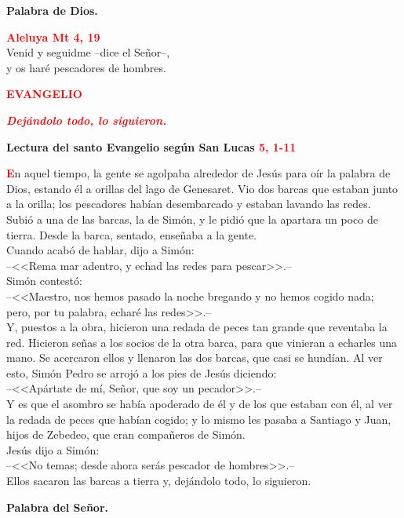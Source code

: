 \documentclass[12pt, letterpaper]{article}
\begin{document}
    {\bfseries Palabra de Dios.}

    \begin{center}
    \Large {\bfseries \textcolor{red}{Aleluya \hspace{1cm} Mt 4, 19}}\\
    Venid y seguidme --dice el Se\~nor--,\\
    y os har\'e pescadores de hombres.
    \end{center}

    \begin{center}
    \Large {\bfseries \textcolor{red}{EVANGELIO}}
    \end{center}

    \begin{center}
    \large {\bfseries \textit{ \textcolor{red}{Dej\'andolo todo, lo siguieron.}}}
    \end{center}

    \Huge \textcolor{red}{} \Large {\bfseries Lectura del santo Evangelio seg\'un San Lucas \hspace{1cm} \textcolor{red}{5, 1-11}}

    \lettrine[lines=2]{\bfseries \textcolor{red}{E}}{}\Large n aquel tiempo, la gente se agolpaba alrededor de Jes\'us para o\'ir la palabra de Dios, estando \'el a orillas del lago de Genesaret. Vio dos barcas que estaban junto a la orilla; los pescadores hab\'ian desembarcado y estaban lavando las redes.\\
    Subi\'o a una de las barcas, la de Sim\'on, y le pidi\'o que la apartara un poco de tierra. Desde la barca, sentado, ense\~naba a la gente.\\
    Cuando acab\'o de hablar, dijo a Sim\'on:\\
    --<<Rema mar adentro, y echad las redes para pescar>>.--\\
    Sim\'on contest\'o:\\
    --<<Maestro, nos hemos pasado la noche bregando y no hemos cogido nada; pero, por tu palabra, echar\'e las redes>>.--\\
    Y, puestos a la obra, hicieron una redada de peces tan grande que reventaba la red. Hicieron se\~nas a los socios de la otra barca, para que vinieran a echarles una mano. Se acercaron ellos y llenaron las dos barcas, que casi se hund\'ian. Al ver esto, Sim\'on Pedro se arroj\'o a los pies de Jes\'us diciendo:\\
    --<<Ap\'artate de m\'i, Se\~nor, que soy un pecador>>.--\\
    Y es que el asombro se hab\'ia apoderado de \'el y de los que estaban con \'el, al ver la redada de peces que hab\'ian cogido; y lo mismo les pasaba a Santiago y Juan, hijos de Zebedeo, que eran compa\~neros de Sim\'on.\\
    Jes\'us dijo a Sim\'on:\\
    --<<No temas; desde ahora ser\'as pescador de hombres>>.--\\
    Ellos sacaron las barcas a tierra y, dej\'andolo todo, lo siguieron.

    {\bfseries Palabra del Se\~nor.}
\end{document}
